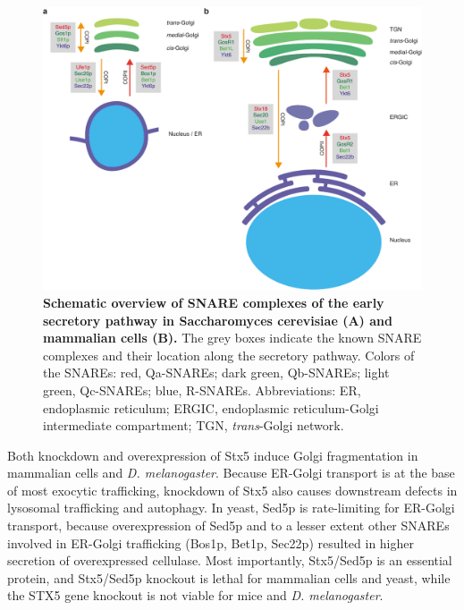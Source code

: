 \begin{figure}
    \includegraphics[keepaspectratio=true,width=\textwidth,height=\textheight]{chapters/chapter5/chapter5_Figure2}
    \caption{\textbf{Schematic overview of SNARE complexes of the early secretory pathway in Saccharomyces cerevisiae (A) and mammalian cells (B).} The grey boxes indicate the known SNARE complexes and their location along the secretory pathway. Colors of the SNAREs: red, Qa-SNAREs; dark green, Qb-SNAREs; light green, Qc-SNAREs; blue, R-SNAREs. Abbreviations: ER, endoplasmic reticulum; ERGIC, endoplasmic reticulum-Golgi intermediate compartment; TGN, \emph{trans}-Golgi network.}
    \label{fig:ch5fig2}
\end{figure}

Both knockdown and overexpression of Stx5 induce Golgi fragmentation in mammalian cells\cite{dascher_syntaxin_1994,suga_rna_2005,amessou_syntaxin_2007} and \emph{D. melanogaster}\cite{zhao_sec22_2015}. Because ER-Golgi transport is at the base of most exocytic trafficking, knockdown of Stx5 also causes downstream defects in lysosomal trafficking and autophagy\cite{renna_autophagic_2011}. In yeast, Sed5p is rate-limiting for ER-Golgi transport, because overexpression of Sed5p and to a lesser extent other SNAREs involved in ER-Golgi trafficking (Bos1p, Bet1p, Sec22p) resulted in higher secretion of overexpressed cellulase\cite{van_zyl_overexpression_2016}. Most importantly, Stx5/Sed5p is an essential protein, and Stx5/Sed5p knockout is lethal for mammalian cells\cite{blomen_gene_2015} and yeast\cite{winzeler_functional_1999}, while the STX5 gene knockout is not viable for mice\cite{koscielny_international_2014} and \emph{D. melanogaster}\cite{xu_syntaxin_2002}.

